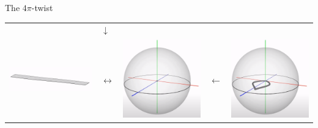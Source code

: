\documentclass[10pt]{beamer}
\begin{document}
\begin{frame}{The $4\pi$-twist}
\begin{center}
\begin{tabular}{m{2cm} m{0.5cm} m{2cm} m{0.5cm} m{2cm}}
 & \hspace{0.7cm} $\downarrow$ \\
            \includegraphics[scale=0.1]{Pictures/flatbelt.png} & $\longleftrightarrow$ & \includegraphics[scale=0.09]{Pictures/4pisphere4.png} & $\longleftarrow$ & \includegraphics[scale=0.09]{Pictures/4pisphere3.png}

\end{tabular}
\end{center}
\end{frame}
\end{document}
